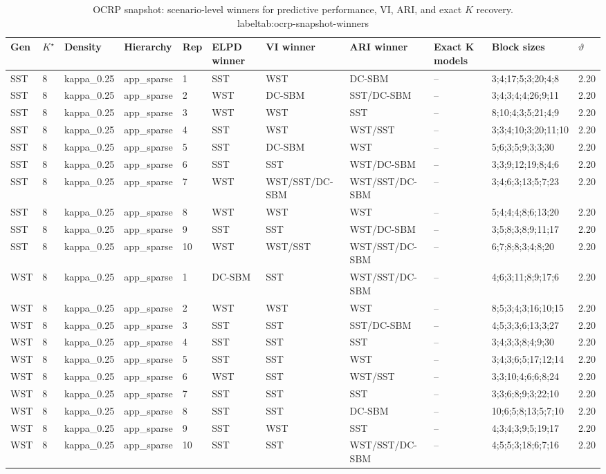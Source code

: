 \begin{table}[!h]
\centering
\caption{OCRP snapshot: scenario-level winners for predictive performance, VI, ARI, and exact $K$ recovery.\\label{tab:ocrp-snapshot-winners}}
\centering
\begin{tabular}[t]{lllllllllll}
\toprule
Gen & $K^\star$ & Density & Hierarchy & Rep & ELPD winner & VI winner & ARI winner & Exact K models & Block sizes & $\vartheta$\\
\midrule
SST & 8 & kappa_0.25 & app_sparse & 1 & SST & WST & DC-SBM & -- & 3;4;17;5;3;20;4;8 & 2.20\\
SST & 8 & kappa_0.25 & app_sparse & 2 & WST & DC-SBM & SST/DC-SBM & -- & 3;4;3;4;4;26;9;11 & 2.20\\
SST & 8 & kappa_0.25 & app_sparse & 3 & WST & WST & SST & -- & 8;10;4;3;5;21;4;9 & 2.20\\
SST & 8 & kappa_0.25 & app_sparse & 4 & SST & WST & WST/SST & -- & 3;3;4;10;3;20;11;10 & 2.20\\
SST & 8 & kappa_0.25 & app_sparse & 5 & SST & DC-SBM & WST & -- & 5;6;3;5;9;3;3;30 & 2.20\\
SST & 8 & kappa_0.25 & app_sparse & 6 & SST & SST & WST/DC-SBM & -- & 3;3;9;12;19;8;4;6 & 2.20\\
SST & 8 & kappa_0.25 & app_sparse & 7 & WST & WST/SST/DC-SBM & WST/SST/DC-SBM & -- & 3;4;6;3;13;5;7;23 & 2.20\\
SST & 8 & kappa_0.25 & app_sparse & 8 & WST & WST & WST & -- & 5;4;4;4;8;6;13;20 & 2.20\\
SST & 8 & kappa_0.25 & app_sparse & 9 & SST & SST & WST/DC-SBM & -- & 3;5;8;3;8;9;11;17 & 2.20\\
SST & 8 & kappa_0.25 & app_sparse & 10 & WST & WST/SST & WST/SST/DC-SBM & -- & 6;7;8;8;3;4;8;20 & 2.20\\
WST & 8 & kappa_0.25 & app_sparse & 1 & DC-SBM & SST & WST/SST/DC-SBM & -- & 4;6;3;11;8;9;17;6 & 2.20\\
WST & 8 & kappa_0.25 & app_sparse & 2 & WST & WST & WST & -- & 8;5;3;4;3;16;10;15 & 2.20\\
WST & 8 & kappa_0.25 & app_sparse & 3 & SST & SST & SST/DC-SBM & -- & 4;5;3;3;6;13;3;27 & 2.20\\
WST & 8 & kappa_0.25 & app_sparse & 4 & SST & SST & SST & -- & 3;4;3;3;8;4;9;30 & 2.20\\
WST & 8 & kappa_0.25 & app_sparse & 5 & SST & SST & WST & -- & 3;4;3;6;5;17;12;14 & 2.20\\
WST & 8 & kappa_0.25 & app_sparse & 6 & WST & SST & WST/SST & -- & 3;3;10;4;6;6;8;24 & 2.20\\
WST & 8 & kappa_0.25 & app_sparse & 7 & SST & SST & SST & -- & 3;3;6;8;9;3;22;10 & 2.20\\
WST & 8 & kappa_0.25 & app_sparse & 8 & SST & SST & DC-SBM & -- & 10;6;5;8;13;5;7;10 & 2.20\\
WST & 8 & kappa_0.25 & app_sparse & 9 & SST & WST & SST & -- & 4;3;4;3;9;5;19;17 & 2.20\\
WST & 8 & kappa_0.25 & app_sparse & 10 & SST & SST & WST/SST/DC-SBM & -- & 4;5;5;3;18;6;7;16 & 2.20\\
\bottomrule
\end{tabular}
\end{table}
